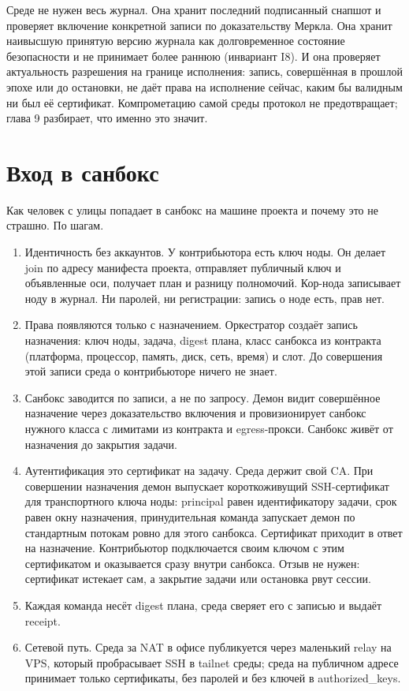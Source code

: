 Среде не нужен весь журнал. Она хранит последний подписанный снапшот и проверяет включение конкретной записи по доказательству Меркла. Она хранит наивысшую принятую версию журнала как долговременное состояние безопасности и не принимает более раннюю (инвариант I8). И она проверяет актуальность разрешения на границе исполнения: запись, совершённая в прошлой эпохе или до остановки, не даёт права на исполнение сейчас, каким бы валидным ни был её сертификат. Компрометацию самой среды протокол не предотвращает; глава 9 разбирает, что именно это значит.

\section{Вход в санбокс}

Как человек с улицы попадает в санбокс на машине проекта и почему это не страшно. По шагам.

\begin{enumerate}
\item Идентичность без аккаунтов. У контрибьютора есть ключ ноды. Он делает join по адресу манифеста проекта, отправляет публичный ключ и объявленные оси, получает план и разницу полномочий. Кор-нода записывает ноду в журнал. Ни паролей, ни регистрации: запись о ноде есть, прав нет.
\item Права появляются только с назначением. Оркестратор создаёт запись назначения: ключ ноды, задача, digest плана, класс санбокса из контракта (платформа, процессор, память, диск, сеть, время) и слот. До совершения этой записи среда о контрибьюторе ничего не знает.
\item Санбокс заводится по записи, а не по запросу. Демон видит совершённое назначение через доказательство включения и провизионирует санбокс нужного класса с лимитами из контракта и egress-прокси. Санбокс живёт от назначения до закрытия задачи.
\item Аутентификация это сертификат на задачу. Среда держит свой CA. При совершении назначения демон выпускает короткоживущий SSH-сертификат для транспортного ключа ноды: principal равен идентификатору задачи, срок равен окну назначения, принудительная команда запускает демон по стандартным потокам ровно для этого санбокса. Сертификат приходит в ответ на назначение. Контрибьютор подключается своим ключом с этим сертификатом и оказывается сразу внутри санбокса. Отзыв не нужен: сертификат истекает сам, а закрытие задачи или остановка рвут сессии.
\item Каждая команда несёт digest плана, среда сверяет его с записью и выдаёт receipt.
\item Сетевой путь. Среда за NAT в офисе публикуется через маленький relay на VPS, который пробрасывает SSH в tailnet среды; среда на публичном адресе принимает только сертификаты, без паролей и без ключей в authorized\_keys.
\end{enumerate}

